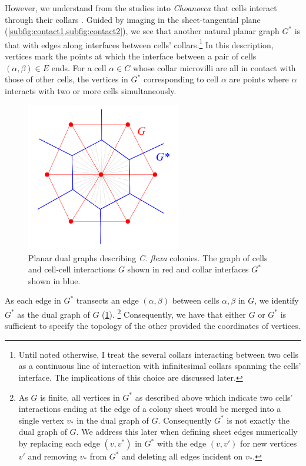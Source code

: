 However, we understand from the studies into \textit{Choanoeca} that cells interact through their collars \citep{ellis1930,leadbeater1983,brunet2019}. 
Guided by imaging in the sheet-tangential plane (\cref{subfig:contact1,subfig:contact2}), we see that another natural planar graph $G^*$ is that with edges along interfaces between cells' collars.\footnote{Until noted otherwise, I treat the several collars interacting between two cells as a continuous line of interaction with infinitesimal collars spanning the cells' interface. The implications of this choice are discussed later.} 
In this description, vertices mark the points at which the interface between a pair of cells $(\alpha, \beta)\in E$ ends. 
For a cell $\alpha\in C$ whose collar microvilli are all in contact with those of other cells, the vertices in $G^*$ corresponding to cell $\alpha$ are points where $\alpha$ interacts with two or more cells simultaneously.

\begin{figure}[htbp]
    \centering
    \includegraphics[width=0.6\textwidth]{duals.png}
    \caption[Planar dual graphs describing \textit{C. flexa} colonies]{Planar dual graphs describing \textit{C. flexa} colonies. The graph of cells and cell-cell interactions $G$ shown in red and collar interfaces $G^*$ shown in blue.}
    \label{fig:duals}
\end{figure}

As each edge in $G^*$ transects an edge $(\alpha, \beta)$ between cells $\alpha, \beta$ in $G$, we identify $G^*$ as the dual graph of $G$ (\cref{fig:duals}). \footnote{As $G$ is finite, all vertices in $G^*$ as described above which indicate two cells' interactions ending at the edge of a colony sheet would be merged into a single vertex $v_*$ in the dual graph of $G$. Consequently $G^*$ is not exactly the dual graph of $G$. We address this later when defining sheet edges numerically by replacing each edge $(v, v^*)$ in $G^*$ with the edge $(v, v')$ for new vertices $v'$ and removing $v_*$ from $G^*$ and deleting all edges incident on $v_*$.}
Consequently, we have that either $G$ or $G^*$ is sufficient to specify the topology of the other provided the coordinates of vertices. 

